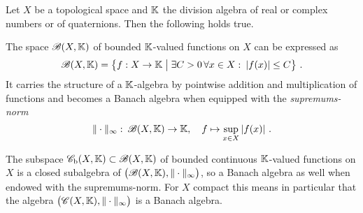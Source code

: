\begin{proposition}
  Let $X$ be a topological space and $\mathbb{K}$ the division algebra of real or complex numbers or of quaternions.
  Then the following holds true.
  \begin{romanlist}
  \item
    The space $\mathscr{B} (X,\mathbb{K})$ of bounded $\mathbb{K}$-valued functions on $X$ can be expressed as
    \begin{equation}
      \label{eq:algebra-bounded-functions-values-real-complex-numbers-quaternions}
      \bFcts (X,\fldK) = 
      \big\{ f : X \to \fldK \bigmid 
      \exists C > 0 \, \forall x\in X :\:  |f(x)| \leq C \big\} \ .
    \end{equation}
    It carries the structure of a $\mathbb{K}$-algebra by pointwise addition and multiplication of functions
    and becomes  a Banach algebra when equipped with the \emph{supremums-norm}
    \[
      \| \cdot \|_\infty : \: \mathscr{B} (X,\mathbb{K}) \to \mathbb{K},\quad
      f \mapsto \sup_{x\in X} |f(x)| \ .
    \]
    \item 
    The subspace $\mathscr{C}_\textup{b} (X,\mathbb{K}) \subset \mathscr{B} (X,\mathbb{K})$ 
    of bounded continuous $\mathbb{K}$-valued functions on $X$ is a closed subalgebra of
    $\big( \mathscr{B} (X,\mathbb{K}) , \| \cdot \|_\infty\big)$,
    so a Banach algebra as well when endowed with the supremums-norm. 
    For $X$ compact this means in particular that the algebra $\big( \mathscr{C} (X,\mathbb{K}), \| \cdot \|_\infty\big)$
    is a Banach algebra.
  \end{romanlist}
\end{proposition}

